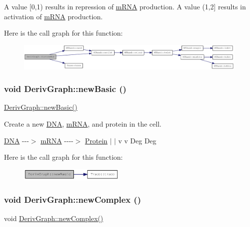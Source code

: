 A value \mbox{[}0,1) results in repression of \hyperlink{classmRNA}{mRNA} production. A value (1,2\mbox{]} results in activation of \hyperlink{classmRNA}{mRNA} production. 

Here is the call graph for this function:\nopagebreak
\begin{figure}[H]
\begin{center}
\leavevmode
\includegraphics[width=420pt]{classDerivGraph_ae39d9acba4901f668d8a85c88bfcc21a_cgraph}
\end{center}
\end{figure}
\hypertarget{classDerivGraph_a8862d4f9ebbd3eced9d56a81fe91c4fb}{
\subsubsection[{newBasic}]{\setlength{\rightskip}{0pt plus 5cm}void DerivGraph::newBasic ()}}
\label{classDerivGraph_a8862d4f9ebbd3eced9d56a81fe91c4fb}
\hyperlink{classDerivGraph_a8862d4f9ebbd3eced9d56a81fe91c4fb}{DerivGraph::newBasic()}

Create a new \hyperlink{classDNA}{DNA}, \hyperlink{classmRNA}{mRNA}, and protein in the cell.

\hyperlink{classDNA}{DNA} -\/-\/-\/$>$ \hyperlink{classmRNA}{mRNA} -\/-\/-\/-\/$>$ \hyperlink{classProtein}{Protein} $|$ $|$ v v Deg Deg 

Here is the call graph for this function:\nopagebreak
\begin{figure}[H]
\begin{center}
\leavevmode
\includegraphics[width=144pt]{classDerivGraph_a8862d4f9ebbd3eced9d56a81fe91c4fb_cgraph}
\end{center}
\end{figure}
\hypertarget{classDerivGraph_a4be722e989002430ca7c363dce500638}{
\subsubsection[{newComplex}]{\setlength{\rightskip}{0pt plus 5cm}void DerivGraph::newComplex ()}}
\label{classDerivGraph_a4be722e989002430ca7c363dce500638}
void \hyperlink{classDerivGraph_a4be722e989002430ca7c363dce500638}{DerivGraph::newComplex()}

